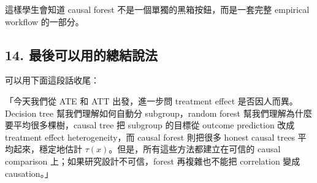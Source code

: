 \documentclass[
  chinese,
  11pt,
]{article}
\begin{document}
這樣學生會知道 causal forest 不是一個單獨的黑箱按鈕，而是一套完整
empirical workflow 的一部分。

\subsection{14.
最後可以用的總結說法}\label{ux6700ux5f8cux53efux4ee5ux7528ux7684ux7e3dux7d50ux8aaaux6cd5}

可以用下面這段話收尾：

「今天我們從 ATE 和 ATT 出發，進一步問 treatment effect
是否因人而異。Decision tree 幫我們理解如何自動分 subgroup，random forest
幫我們理解為什麼要平均很多棵樹，causal tree 把 subgroup 的目標從 outcome
prediction 改成 treatment effect heterogeneity，而 causal forest
則把很多 honest causal trees 平均起來，穩定地估計
\(\tau(x)\)。但是，所有這些方法都建立在可信的 causal comparison
上；如果研究設計不可信，forest 再複雜也不能把 correlation 變成
causation。」
\end{document}
